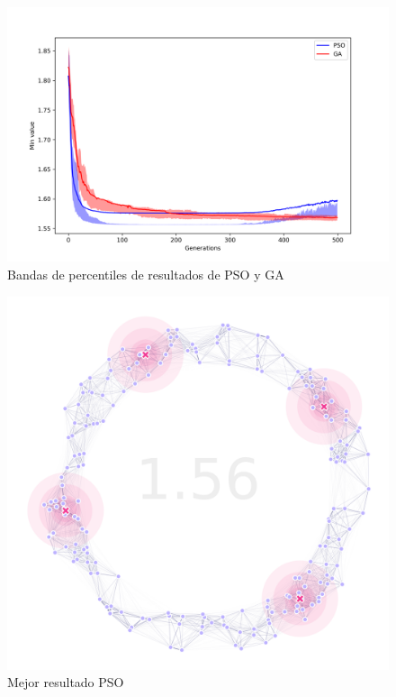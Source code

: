 \documentclass[letterpaper]{report}
\begin{document}
    \begin{figure}[ht!]
      \centering
      \includegraphics[width=\textwidth]{percentile.png}
      \caption{Bandas de percentiles de resultados de PSO y GA}
      \label{fig:percentile}
    \end{figure}

    \begin{figure}[ht!]
      \centering
      \includegraphics[width=\textwidth]{pso-best.png}
      \caption{Mejor resultado PSO}
      \label{fig:pso-best}
    \end{figure}
\end{document}
